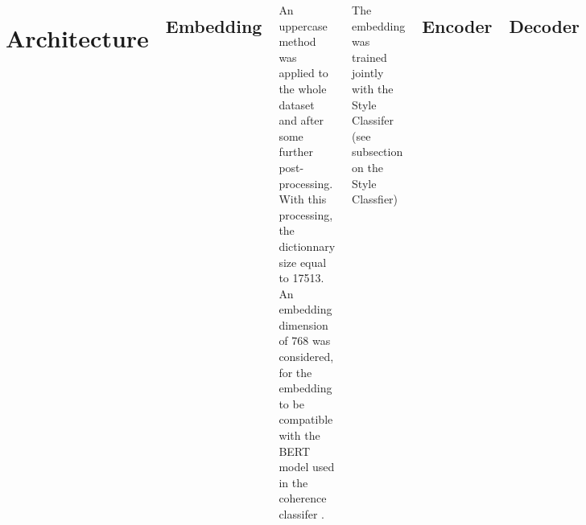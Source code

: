 \documentclass[20pt,margin=1in,innermargin=-4.5in,blockverticalspace=-0.25in]{tikzposter}
\begin{document}
\begin{columns}
{   
    \section*{Architecture}
    
    \subsection*{Embedding}
    
    An uppercase method was applied to the whole dataset and after some further post-processing\cite{lequel}. With this processing, the dictionnary size equal to 17513.
    An embedding dimension of 768 was considered, for the embedding to be compatible with the BERT model used in the coherence classifer \cite{ref}. 
    
    The embedding was trained jointly with the Style Classifer (see subsection on the Style Classfier)    
    
    \subsection*{Encoder}
	
	

    \subsection*{Decoder}
    \subsection*{Coherence Classifer}
    
	    
    
    \subsection*{Style Classifer \label{subsectionStyleClassifier}}
   	
    The Style classifier takes as inputs two sentences $x_1,x_2$ and predicts their respectives styles $(\hat{l_1},\hat{l_2})$. It is evaluated with a binary cross entropy loss against their actual style $(l_1,l_2)$. 
    
     
    For simplification purposes, the embedding layer was prepended to the style classifier and both modules were trained together. The training took place over the whole dataset and plateau with an accuracy of xx \% (vs. 86.78 \% in the reference paper).
    
    
    
    }


    

    
\end{columns}
\end{document}
